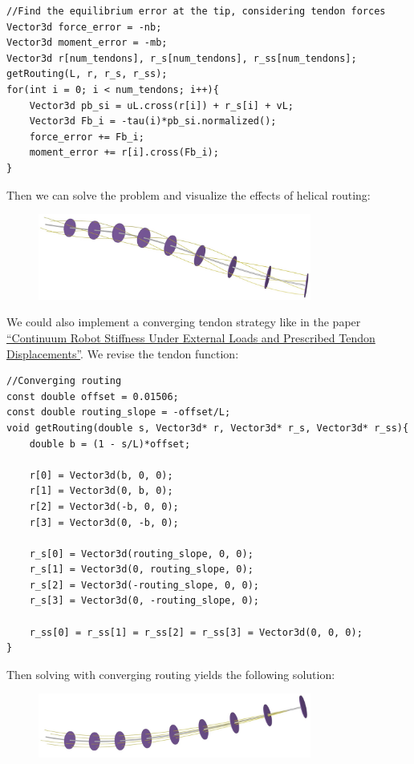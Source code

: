 \documentclass[12pt]{article}
\begin{document}
\begin{lstlisting}
//Find the equilibrium error at the tip, considering tendon forces
Vector3d force_error = -nb;
Vector3d moment_error = -mb;
Vector3d r[num_tendons], r_s[num_tendons], r_ss[num_tendons];
getRouting(L, r, r_s, r_ss);
for(int i = 0; i < num_tendons; i++){
    Vector3d pb_si = uL.cross(r[i]) + r_s[i] + vL;
    Vector3d Fb_i = -tau(i)*pb_si.normalized();
    force_error += Fb_i;
    moment_error += r[i].cross(Fb_i);
}
\end{lstlisting}
Then we can solve the problem and visualize the effects of helical routing:
\begin{figure}[h]
	\centering
		\includegraphics[width=0.8\textwidth]{fig/Helical.jpg}
\end{figure}

We could also implement a converging tendon strategy like in the paper \href{https://ieeexplore.ieee.org/document/8606257}{``Continuum Robot Stiffness Under External Loads and Prescribed Tendon Displacements''}. We revise the tendon function:
\begin{lstlisting}
//Converging routing
const double offset = 0.01506;
const double routing_slope = -offset/L;
void getRouting(double s, Vector3d* r, Vector3d* r_s, Vector3d* r_ss){
    double b = (1 - s/L)*offset;

    r[0] = Vector3d(b, 0, 0);
    r[1] = Vector3d(0, b, 0);
    r[2] = Vector3d(-b, 0, 0);
    r[3] = Vector3d(0, -b, 0);

    r_s[0] = Vector3d(routing_slope, 0, 0);
    r_s[1] = Vector3d(0, routing_slope, 0);
    r_s[2] = Vector3d(-routing_slope, 0, 0);
    r_s[3] = Vector3d(0, -routing_slope, 0);

    r_ss[0] = r_ss[1] = r_ss[2] = r_ss[3] = Vector3d(0, 0, 0);
}
\end{lstlisting}
Then solving with converging routing yields the following solution:
\begin{figure}[h]
	\centering
		\includegraphics[width=0.8\textwidth]{fig/Converging.jpg}
\end{figure}
\end{document}
